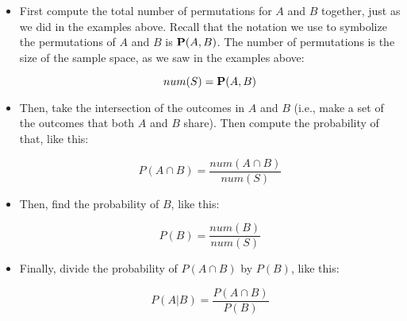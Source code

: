 \documentclass[../../../main.tex]{subfiles}
\begin{document}
\begin{itemize}

  \item First compute the total number of permutations for $A$ and $B$ together, just as we did in the examples above. Recall that the notation we use to symbolize the permutations of $A$ and $B$ is $\mathbf{P}(A, B)$. The number of permutations is the size of the sample space, as we saw in the examples above: 
  
    \begin{equation*}
      num(S) = \mathbf{P}(A, B)
    \end{equation*}
  
  \item Then, take the intersection of the outcomes in $A$ and $B$ (i.e., make a set of the outcomes that both $A$ and $B$ share). Then compute the probability of that, like this:
  
    \begin{equation*}
      P(A \cap B) = \frac{num(A \cap B)}{num(S)}
    \end{equation*}
  
  \item Then, find the probability of $B$, like this:
  
    \begin{equation*}
      P(B) = \frac{num(B)}{num(S)}
    \end{equation*}
  
  \item Finally, divide the probability of $P(A \cap B)$ by $P(B)$, like this:
  
    \begin{equation*}
      P(A | B) = \frac{P(A \cap B)}{P(B)}
    \end{equation*}

\end{itemize}
\end{document}
